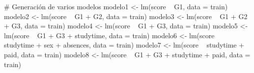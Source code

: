 \documentclass[]{article}
\newenvironment{Shaded}{\begin{snugshade}}{\end{snugshade}}
\newcommand{\CommentTok}[1]{\textcolor[rgb]{0.50,0.62,0.50}{#1}}
\newcommand{\DataTypeTok}[1]{\textcolor[rgb]{0.87,0.87,0.75}{#1}}
\newcommand{\KeywordTok}[1]{\textcolor[rgb]{0.94,0.87,0.69}{#1}}
\newcommand{\NormalTok}[1]{\textcolor[rgb]{0.80,0.80,0.80}{#1}}
\newcommand{\OperatorTok}[1]{\textcolor[rgb]{0.94,0.94,0.82}{#1}}
\newcommand{\StringTok}[1]{\textcolor[rgb]{0.80,0.58,0.58}{#1}}
\begin{document}
\begin{Shaded}
\begin{Highlighting}[]
\CommentTok{# Generación de varios modelos}
\NormalTok{modelo1 <-}\StringTok{ }\KeywordTok{lm}\NormalTok{(score }\OperatorTok{~}\StringTok{ }\NormalTok{G1, }\DataTypeTok{data =}\NormalTok{ train)}
\NormalTok{modelo2 <-}\StringTok{ }\KeywordTok{lm}\NormalTok{(score }\OperatorTok{~}\StringTok{ }\NormalTok{G1 }\OperatorTok{+}\StringTok{ }\NormalTok{G2, }\DataTypeTok{data =}\NormalTok{ train)}
\NormalTok{modelo3 <-}\StringTok{ }\KeywordTok{lm}\NormalTok{(score }\OperatorTok{~}\StringTok{ }\NormalTok{G1 }\OperatorTok{+}\StringTok{ }\NormalTok{G2 }\OperatorTok{+}\StringTok{ }\NormalTok{G3, }\DataTypeTok{data =}\NormalTok{ train)}
\NormalTok{modelo4 <-}\StringTok{ }\KeywordTok{lm}\NormalTok{(score }\OperatorTok{~}\StringTok{ }\NormalTok{G1 }\OperatorTok{+}\StringTok{ }\NormalTok{G3, }\DataTypeTok{data =}\NormalTok{ train)}
\NormalTok{modelo5 <-}\StringTok{ }\KeywordTok{lm}\NormalTok{(score }\OperatorTok{~}\StringTok{ }\NormalTok{G1 }\OperatorTok{+}\StringTok{ }\NormalTok{G3 }\OperatorTok{+}\StringTok{ }\NormalTok{studytime, }\DataTypeTok{data =}\NormalTok{ train)}
\NormalTok{modelo6 <-}\StringTok{ }\KeywordTok{lm}\NormalTok{(score }\OperatorTok{~}\StringTok{ }\NormalTok{studytime }\OperatorTok{+}\StringTok{ }\NormalTok{sex }\OperatorTok{+}\StringTok{ }\NormalTok{absences, }\DataTypeTok{data =}\NormalTok{ train)}
\NormalTok{modelo7 <-}\StringTok{ }\KeywordTok{lm}\NormalTok{(score }\OperatorTok{~}\StringTok{ }\NormalTok{studytime }\OperatorTok{+}\StringTok{ }\NormalTok{paid, }\DataTypeTok{data =}\NormalTok{ train)}
\NormalTok{modelo8 <-}\StringTok{ }\KeywordTok{lm}\NormalTok{(score }\OperatorTok{~}\StringTok{ }\NormalTok{G1 }\OperatorTok{+}\StringTok{ }\NormalTok{G3 }\OperatorTok{+}\StringTok{ }\NormalTok{studytime }\OperatorTok{+}\StringTok{ }\NormalTok{paid, }\DataTypeTok{data =}\NormalTok{ train)}


\end{Highlighting}
\end{Shaded}
\end{document}
